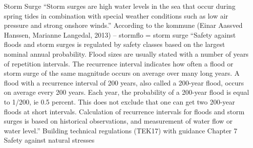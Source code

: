 \documentclass{article}
\begin{document}
Storm Surge
“Storm surges are high water levels in the sea that occur during spring tides in combination with special weather conditions such as low air pressure and strong onshore winds.” According to the kommune (Einar Aassved Hanssen, Marianne Langedal, 2013) – stormflo = storm surge
“Safety against floods and storm surges is regulated by safety classes based on the
largest nominal annual probability. Flood sizes are usually stated with a number of
years of repetition intervals. The recurrence interval indicates how often a flood or
storm surge of the same magnitude occurs on average over many long years. A flood
with a recurrence interval of 200 years, also called a 200-year flood, occurs on average
every 200 years. Each year, the probability of a 200-year flood is equal to 1/200, ie 0.5 percent.
This does not exclude that one can get two 200-year floods at short intervals.
Calculation of recurrence intervals for floods and storm surges is based on historical
observations, and measurement of water flow or water level.”
Building technical regulations (TEK17) with guidance Chapter 7 Safety against natural stresses
\end{document}
